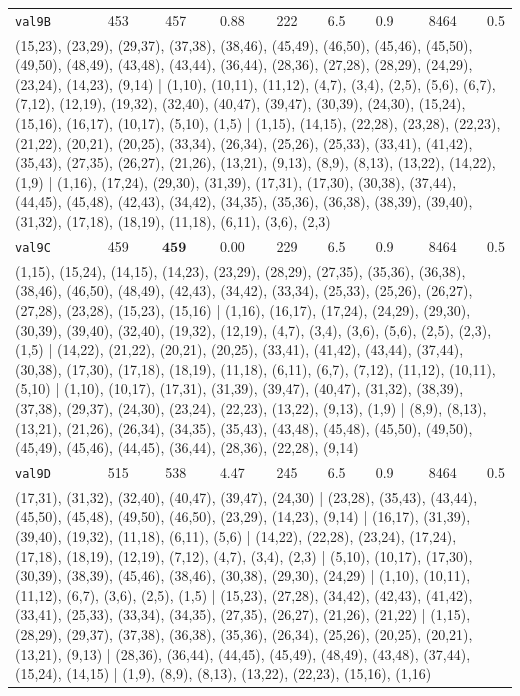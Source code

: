 \begin{landscape}
\begin{longtable}{lrrrrrrrr}
\texttt{val9B} & 453 & 457 & 0.88 & 222 & 6.5 & 0.9 & 8464 & 0.5 \\
\multicolumn{9}{p{0.96\linewidth}}{\tiny\raggedright\arraybackslash (15,23), (23,29), (29,37), (37,38), (38,46), (45,49), (46,50), (45,46), (45,50), (49,50), (48,49), (43,48), (43,44), (36,44), (28,36), (27,28), (28,29), (24,29), (23,24), (14,23), (9,14) | (1,10), (10,11), (11,12), (4,7), (3,4), (2,5), (5,6), (6,7), (7,12), (12,19), (19,32), (32,40), (40,47), (39,47), (30,39), (24,30), (15,24), (15,16), (16,17), (10,17), (5,10), (1,5) | (1,15), (14,15), (22,28), (23,28), (22,23), (21,22), (20,21), (20,25), (33,34), (26,34), (25,26), (25,33), (33,41), (41,42), (35,43), (27,35), (26,27), (21,26), (13,21), (9,13), (8,9), (8,13), (13,22), (14,22), (1,9) | (1,16), (17,24), (29,30), (31,39), (17,31), (17,30), (30,38), (37,44), (44,45), (45,48), (42,43), (34,42), (34,35), (35,36), (36,38), (38,39), (39,40), (31,32), (17,18), (18,19), (11,18), (6,11), (3,6), (2,3)} \\[2pt]
\texttt{val9C} & 459 & $\mathbf{459}$ & 0.00 & 229 & 6.5 & 0.9 & 8464 & 0.5 \\
\multicolumn{9}{p{0.96\linewidth}}{\tiny\raggedright\arraybackslash (1,15), (15,24), (14,15), (14,23), (23,29), (28,29), (27,35), (35,36), (36,38), (38,46), (46,50), (48,49), (42,43), (34,42), (33,34), (25,33), (25,26), (26,27), (27,28), (23,28), (15,23), (15,16) | (1,16), (16,17), (17,24), (24,29), (29,30), (30,39), (39,40), (32,40), (19,32), (12,19), (4,7), (3,4), (3,6), (5,6), (2,5), (2,3), (1,5) | (14,22), (21,22), (20,21), (20,25), (33,41), (41,42), (43,44), (37,44), (30,38), (17,30), (17,18), (18,19), (11,18), (6,11), (6,7), (7,12), (11,12), (10,11), (5,10) | (1,10), (10,17), (17,31), (31,39), (39,47), (40,47), (31,32), (38,39), (37,38), (29,37), (24,30), (23,24), (22,23), (13,22), (9,13), (1,9) | (8,9), (8,13), (13,21), (21,26), (26,34), (34,35), (35,43), (43,48), (45,48), (45,50), (49,50), (45,49), (45,46), (44,45), (36,44), (28,36), (22,28), (9,14)} \\[2pt]
\texttt{val9D} & 515 & 538 & 4.47 & 245 & 6.5 & 0.9 & 8464 & 0.5 \\
\multicolumn{9}{p{0.96\linewidth}}{\tiny\raggedright\arraybackslash (17,31), (31,32), (32,40), (40,47), (39,47), (24,30) | (23,28), (35,43), (43,44), (45,50), (45,48), (49,50), (46,50), (23,29), (14,23), (9,14) | (16,17), (31,39), (39,40), (19,32), (11,18), (6,11), (5,6) | (14,22), (22,28), (23,24), (17,24), (17,18), (18,19), (12,19), (7,12), (4,7), (3,4), (2,3) | (5,10), (10,17), (17,30), (30,39), (38,39), (45,46), (38,46), (30,38), (29,30), (24,29) | (1,10), (10,11), (11,12), (6,7), (3,6), (2,5), (1,5) | (15,23), (27,28), (34,42), (42,43), (41,42), (33,41), (25,33), (33,34), (34,35), (27,35), (26,27), (21,26), (21,22) | (1,15), (28,29), (29,37), (37,38), (36,38), (35,36), (26,34), (25,26), (20,25), (20,21), (13,21), (9,13) | (28,36), (36,44), (44,45), (45,49), (48,49), (43,48), (37,44), (15,24), (14,15) | (1,9), (8,9), (8,13), (13,22), (22,23), (15,16), (1,16)} \\[2pt]

\end{longtable}
\end{landscape}
